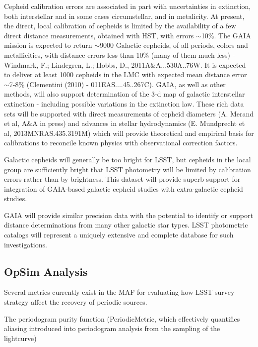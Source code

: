 Cepheid calibration errors are associated in part with uncertainties in extinction, both interstellar and in some cases circumstellar, and in metalicity.  At present, the direct, local calibration of cepheids is limited by the availability of a few direct distance measurements, obtained with HST, with errors $\sim$10\%.  The GAIA mission is expected to return $\sim$9000 Galactic cepheids, of all periods, colors and metallicities, with distance errors less than 10\% (many of them much less) - Windmark, F.; Lindegren, L.; Hobbs, D., 2011A&A...530A..76W. It is expected to deliver at least 1000 cepheids in the LMC with expected mean distance error $\sim$7-8\% (Clementini (2010) - 011EAS....45..267C).  GAIA, as well as other methods, will also support determination of the 3-d map of galactic interstellar extinction - including possible variations in the extinction law. These rich data sets will be supported with direct measurements of cepheid diameters (A. Merand et al, A\&A in press) and advances in stellar hydrodynamics (E. Mundprecht et al, 2013MNRAS.435.3191M) which will provide theoretical and empirical basis for calibrations to reconcile known physics with observational correction factors.

Galactic cepheids will generally be too bright for LSST, but cepheids in the local group are sufficiently bright that LSST photometry will be limited by calibration errors rather than by brightness.  This dataset will provide superb support for integration of GAIA-based galactic cepheid studies with extra-galactic cepheid studies.

GAIA will provide similar precision data with the potential to identify or support distance determinations from many other galactic star types.  LSST photometric catalogs will represent a uniquely extensive and complete database for such investigations.


\subsection{OpSim Analysis}
\label{sec:keyword:analysis}


Several metrics currently exist in the MAF for evaluating how LSST survey strategy affect the recovery of periodic sources. 

The periodogram purity function (PeriodicMetric, which effectively quantifies aliasing introduced into periodogram analysis from the sampling of the lightcurve)

